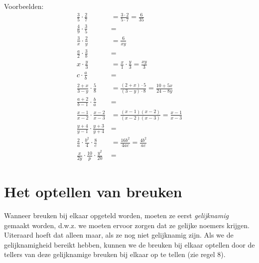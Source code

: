 
Voorbeelden:
\begin{align*}
\frac{3}{5} \cdot \frac{2}{7}     &= \frac{3 \cdot 2}{5 \cdot 7} = \frac{6}{35} \\[1em]
\frac{4}{9} \cdot \frac{3}{5}     &= \\[1em]
\frac{3}{x} \cdot \frac{2}{y}     &= \frac{6}{xy} \\[1em]
\frac{a}{2} \cdot \frac{3}{b}     &= \\[1em]
x \cdot \frac{y}{3}               &= \frac{x}{1} \cdot \frac{y}{3} = \frac{xy}{3} \\[1em]
c \cdot \frac{a}{b}               &= \\[1em]
\frac{2+x}{3-y} \cdot \frac{5}{8} &= \frac{(2+x) \cdot 5}{(3-y) \cdot 8} = \frac{10+5x}{24-8y} \\[1em]
\frac{a+2}{b-1} \cdot \frac{b}{a} &= \\[1em]
\frac{x-1}{x-2} \cdot \frac{x-2}{x-3} &= \frac{(x-1)(x-2)}{(x-2)(x-3)} = \frac{x-1}{x-3} \\[1em]
\frac{y+4}{y-1} \cdot \frac{y+3}{y+4} &= \\[1em]
\frac{2}{a} \cdot \frac{b^2}{4} \cdot \frac{8}{c}    &= \frac{16b^2}{4ac} = \frac{4b^2}{ac} \\[1em]
\frac{x}{2y} \cdot \frac{10}{p} \cdot \frac{y^2}{20} &=
\end{align*}

\section{Het optellen van breuken}
Wanneer breuken bij elkaar opgeteld worden, moeten ze eerst \emph{gelijknamig} gemaakt worden, d.w.z. we moeten ervoor zorgen dat ze gelijke noemers krijgen. Uiteraard hoeft dat alleen maar, als ze nog niet gelijknamig zijn. Als we de gelijknamigheid bereikt hebben, kunnen we de breuken bij elkaar optellen door de tellers van deze gelijknamige breuken bij elkaar op te tellen (zie regel 8).


